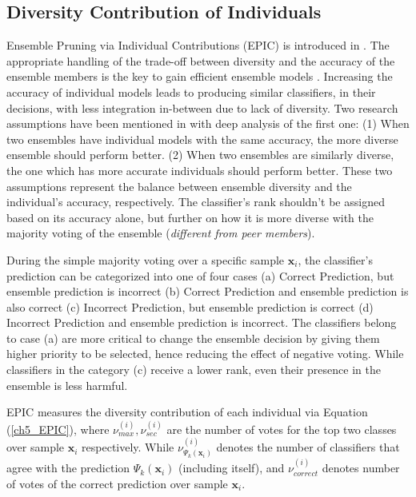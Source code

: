 \subsection{Diversity Contribution of Individuals} \label{ch5_EPIC.div}
Ensemble Pruning via Individual Contributions (EPIC) is introduced in \cite{lu2010}. The appropriate handling of the trade-off between diversity and the accuracy of the ensemble members is the key to gain efficient ensemble models \cite{kuncheva2003,zhang2006,barak2017}. Increasing the accuracy of individual models leads to producing similar classifiers, in their decisions, with less integration in-between \cite{lu2010} due to lack of diversity. Two research assumptions have been mentioned in \cite{lu2010} with deep analysis of the first one: (1) When two ensembles have individual models with the same accuracy, the more diverse ensemble should perform better. (2) When two ensembles are similarly diverse, the one which has more accurate individuals should perform better. These two assumptions represent the balance between ensemble diversity and the individual's accuracy, respectively. The classifier’s rank shouldn’t be assigned  based on its accuracy alone, but further on how it is more diverse with the majority voting of the ensemble (\textit{different from peer members}).

During the simple majority voting over a specific sample $\textbf{x}_i$, the classifier's prediction can be categorized into one of four cases (a) Correct Prediction, but ensemble prediction is incorrect (b) Correct Prediction and ensemble prediction is also correct (c) Incorrect Prediction, but ensemble prediction is correct (d) Incorrect Prediction and ensemble prediction is incorrect. The classifiers belong to case (a) are more critical to change the ensemble decision by giving them higher priority to be selected, hence reducing the effect of negative voting. While classifiers in the category (c) receive a lower rank, even their presence in the ensemble is less harmful.


EPIC \cite{lu2010} measures the diversity contribution of each individual  via Equation (\ref{ch5_EPIC}), where $\nu_{max}^{(i)},\nu^{(i)}_{sec}$ are the number of votes for the top two classes over sample $\textbf{x}_i$ respectively. While $\nu_{\Psi_{k}(\textbf{x}_i)}^{(i)}$ denotes the number of classifiers that agree with the prediction $\Psi_{k}(\textbf{x}_i)$ (including itself), and $\nu_{correct}^{(i)}$ denotes number of votes of the correct prediction over sample $\textbf{x}_i$. 


